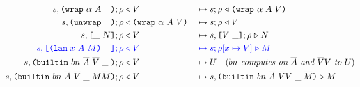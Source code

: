 \begin{figure*}[!ht]
\begin{subfigure}[c]{\linewidth}
{\begin{alignat*}{2}
      s,\inWrapRightFrame{\alpha}{A}; \rho &\return V &{}\mapsto{}& s;\rho \return \wrap{\alpha}{A}{V}\\
      s,\inUnwrapFrame{}; \rho &\return \wrap{\alpha}{A}{V} &{}\mapsto{}& s;\rho \return V\\
      s,\inAppLeftFrame{N}; \rho &\return V &{}\mapsto{}& s, \inAppRightFrame{V};\rho \compute N\\
      \blue{s,\inAppRightFrame{\lam{x}{A}{M}}; \rho} &\breturn V &{}\bmapsto{}& \blue{s;\rho[x\mapsto V] \compute M}\\  %
      s,\inBuiltin
      {bn}
      {\repetition{A}}
      {\repetition{V}}{\_}{}; \rho &\return V &{}\mapsto{}& U \quad (\textit{$bn$ computes on $\repetition{A}$ and $\repetition{V}V$ to $U$})\\
      s,  \inBuiltin{bn}{\repetition{A}}{\repetition{V}}{\_}{M \repetition{M}}{}; \rho&\return V &{}\mapsto{}& s, \inBuiltin{bn}{\repetition{A}}{\repetition{V} V}{\_}{\repetition{M}} \compute M\\
\end{alignat*}
}
\end{subfigure}
\end{figure*}


\begin{comment}
computeCek con (Apply _ fun arg)      = do
    varEnv <- getVarEnv
    computeCek (FrameApplyArg varEnv arg : con) fun
computeCek con (Var _ varName)        = do
computeCek con bi@Builtin{} = returnCek con bi

-- | The returning part of the CEK machine.
-- Returns 'EvaluationSuccess' in case the context is empty, otherwise pops up one frame
-- from the context and either
-- 1. performs reduction and calls 'computeCek' ('FrameTyInstArg', 'FrameApplyFun', 'FrameUnwrap')
-- 2. performs a constant application and calls 'returnCek' ('FrameTyInstArg', 'FrameApplyFun')
-- 3. puts 'FrameApplyFun' on top of the context and proceeds with the argument from 'FrameApplyArg'
-- 4. grows the resulting term ('FrameWrap')
returnCek :: Context -> Plain Value -> CekM EvaluationResult
returnCek []                                  res = pure $ EvaluationSuccess res
returnCek (FrameTyInstArg ty           : con) fun = instantiateEvaluate con ty fun
returnCek (FrameApplyArg argVarEnv arg : con) fun = do
    funVarEnv <- getVarEnv
    withVarEnv argVarEnv $ computeCek (FrameApplyFun funVarEnv fun : con) arg
returnCek (FrameApplyFun funVarEnv fun : con) arg = do
    argVarEnv <- getVarEnv
    applyEvaluate funVarEnv argVarEnv con fun arg
returnCek (FrameWrap ann tyn ty        : con) val = returnCek con $ Wrap ann tyn ty val
returnCek (FrameUnwrap                 : con) dat = case dat of
    Wrap _ _ _ term -> returnCek con term
    term            -> throwError $ MachineException NonWrapUnwrappedMachineError term

\end{comment}

